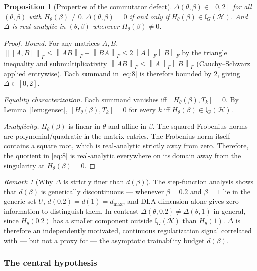 \documentclass[10pt,twocolumn]{article}
\newtheorem{proposition}[definition]{Proposition}
\theoremstyle{remark}
\newtheorem{remark}[definition]{Remark}
\newcommand{\Hil}{\mathcal{H}}
\newcommand{\lG}{\mathfrak{l}_G(\Hil)}
\newcommand{\fronorm}[1]{\left\lVert #1 \right\rVert_{F}}
\begin{document}
\begin{proposition}[Properties of the commutator defect]
\label{prop:defect}
$\Delta(\theta,\beta) \in [0,2]$ for all $(\theta,\beta)$ with $H_\theta(\beta) \neq 0$.  $\Delta(\theta,\beta) = 0$ if and only if $H_\theta(\beta) \in \lG$. And $\Delta$ is real-analytic in $(\theta,\beta)$ wherever $H_\theta(\beta) \neq 0$.
\end{proposition}
\begin{proof}
\textit{Bound.} For any matrices $A,B$, $\fronorm{[A,B]} \le \fronorm{AB} + \fronorm{BA} \le 2\fronorm{A}\fronorm{B}$ by the triangle inequality and submultiplicativity $\fronorm{AB} \le \fronorm{A}\fronorm{B}$ (Cauchy--Schwarz applied entrywise). Each summand in \eqref{eq:8} is therefore bounded by $2$, giving $\Delta \in [0,2]$.

\textit{Equality characterization.} Each summand vanishes iff $[H_\theta(\beta), T_k] = 0$. By Lemma~\ref{lem:genset}, $[H_\theta(\beta), T_k] = 0$ for every $k$ iff $H_\theta(\beta) \in \lG$.

\textit{Analyticity.} $H_\theta(\beta)$ is linear in $\theta$ and affine in $\beta$. The squared Frobenius norms are polynomial/quadratic in the matrix entries. The Frobenius norm itself contains a square root, which is real-analytic strictly away from zero. Therefore, the quotient in \eqref{eq:8} is real-analytic everywhere on its domain away from the singularity at $H_\theta(\beta) = 0$.
\end{proof}

\begin{remark}[Why $\Delta$ is strictly finer than $d(\beta)$]
\label{rem:finer}
The step-function analysis shows that $d(\beta)$ is generically discontinuous --- whenever $\beta=0.2$ and $\beta=1$ lie in the generic set $U$, $d(0.2) = d(1) = d_{\max}$, and DLA dimension alone gives zero information to distinguish them. In contrast $\Delta(\theta,0.2) \neq \Delta(\theta,1)$ in general, since $H_\theta(0.2)$ has a smaller component outside $\lG$ than $H_\theta(1)$. $\Delta$ is therefore an independently motivated, continuous regularization signal correlated with — but not a proxy for — the asymptotic trainability budget $d(\beta)$.
\end{remark}

\subsubsection{The central hypothesis}
\label{sec:hypothesis}
\end{document}

